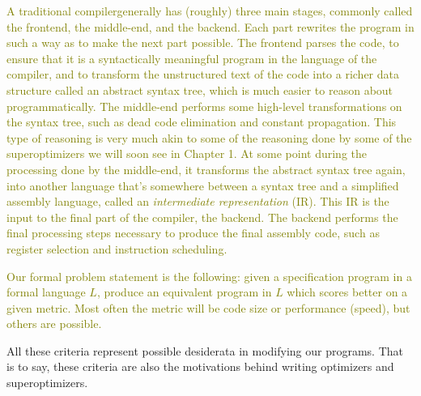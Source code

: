 \documentclass[12pt,twoside]{reedthesis}
\newcommand{\green}[1]{\textcolor{olive}{#1}}
\begin{document}
    \green{
    A traditional compiler\footnotemark generally has (roughly) three main stages, commonly called the frontend, the middle-end, and the backend.
    Each part rewrites the program in such a way as to make the next part possible.
    The frontend parses the code, to ensure that it is a syntactically meaningful program in the language of the compiler, and to transform the unstructured text of the code into a richer data structure called an abstract syntax tree, which is much easier to reason about programmatically.
    The middle-end performs some high-level transformations on the syntax tree, such as dead code elimination and constant propagation.
    This type of reasoning is very much akin to some of the reasoning done by some of the superoptimizers we will soon see in Chapter 1. 
    At some point during the processing done by the middle-end, it transforms the abstract syntax tree again, into another language that's somewhere between a syntax tree and a simplified assembly language, called an \textit{intermediate representation} (IR).
    This IR is the input to the final part of the compiler, the backend.
    The backend performs the final processing steps necessary to produce the final assembly code, such as register selection and instruction scheduling.
    }
    
    
    \green{
    Our formal problem statement is the following: given a specification program in a formal language $L$, produce an equivalent program in $L$ which scores better on a given metric.
    Most often the metric will be code size or performance (speed), but others are possible.
    }
    
    All these criteria represent possible desiderata in modifying our programs.
    That is to say, these criteria are also the motivations behind writing optimizers and superoptimizers. 
    
\end{document}
